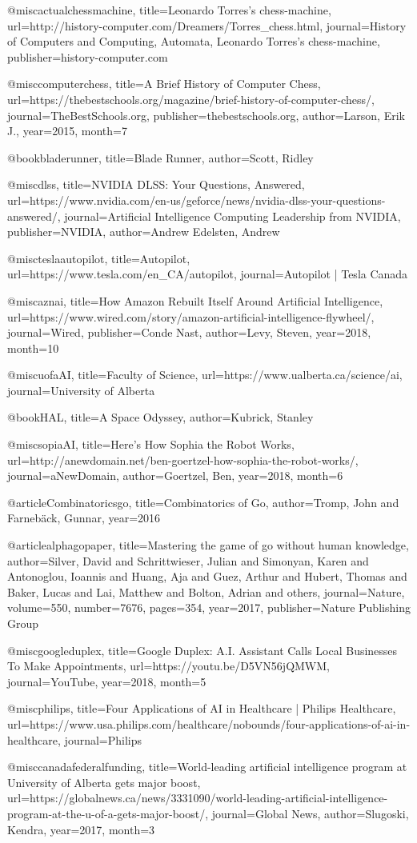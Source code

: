 @misc{actualchessmachine, title={Leonardo Torres's chess-machine}, url={http://history-computer.com/Dreamers/Torres_chess.html}, journal={History of Computers and Computing, Automata, Leonardo Torres's chess-machine}, publisher={history-computer.com}} 


@misc{computerchess, title={A Brief History of Computer Chess}, url={https://thebestschools.org/magazine/brief-history-of-computer-chess/}, journal={TheBestSchools.org}, publisher={thebestschools.org}, author={Larson, Erik J.}, year={2015}, month=7} 

@book{bladerunner, title={Blade Runner}, author={Scott, Ridley}} 

@misc{dlss, title={NVIDIA DLSS: Your Questions, Answered}, url={https://www.nvidia.com/en-us/geforce/news/nvidia-dlss-your-questions-answered/}, journal={Artificial Intelligence Computing Leadership from NVIDIA}, publisher={NVIDIA}, author={Andrew Edelsten, Andrew}} 

@misc{teslaautopilot, title={Autopilot}, url={https://www.tesla.com/en_CA/autopilot}, journal={Autopilot | Tesla Canada}}

@misc{aznai, title={How Amazon Rebuilt Itself Around Artificial Intelligence}, url={https://www.wired.com/story/amazon-artificial-intelligence-flywheel/}, journal={Wired}, publisher={Conde Nast}, author={Levy, Steven}, year={2018}, month=10} 

@misc{uofaAI, title={Faculty of Science}, url={https://www.ualberta.ca/science/ai}, journal={University of Alberta}} 

@book{HAL, title={A Space Odyssey}, author={Kubrick, Stanley} }

@misc{sopiaAI, title={Here's How Sophia the Robot Works}, url={http://anewdomain.net/ben-goertzel-how-sophia-the-robot-works/}, journal={aNewDomain}, author={Goertzel, Ben}, year={2018}, month=6} 

@article{Combinatoricsgo,
  title={Combinatorics of Go},
  author={Tromp, John and Farneb{\"a}ck, Gunnar},
  year={2016}
}

@article{alphagopaper,
  title={Mastering the game of go without human knowledge},
  author={Silver, David and Schrittwieser, Julian and Simonyan, Karen and Antonoglou, Ioannis and Huang, Aja and Guez, Arthur and Hubert, Thomas and Baker, Lucas and Lai, Matthew and Bolton, Adrian and others},
  journal={Nature},
  volume={550},
  number={7676},
  pages={354},
  year={2017},
  publisher={Nature Publishing Group}
}

@misc{googleduplex, title={Google Duplex: A.I. Assistant Calls Local Businesses To Make Appointments}, url={https://youtu.be/D5VN56jQMWM}, journal={YouTube}, year={2018}, month=5} 

@misc{philips, title={Four Applications of AI in Healthcare | Philips Healthcare}, url={https://www.usa.philips.com/healthcare/nobounds/four-applications-of-ai-in-healthcare}, journal={Philips}} 

@misc{canadafederalfunding, title={World-leading artificial intelligence program at University of Alberta gets major boost}, url={https://globalnews.ca/news/3331090/world-leading-artificial-intelligence-program-at-the-u-of-a-gets-major-boost/}, journal={Global News}, author={Slugoski, Kendra}, year={2017}, month=3} 
